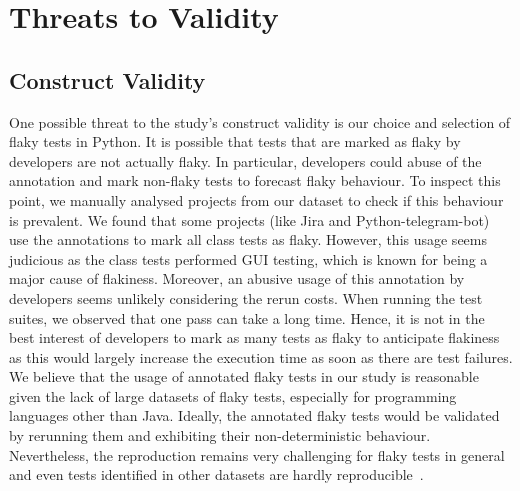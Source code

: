 \section{Threats to Validity}
\label{sec:replication-threats}

\subsection{Construct Validity}
One possible threat to the study's construct validity is our choice and selection of flaky tests in Python.
It is possible that tests that are marked as flaky by developers are not actually flaky.
In particular, developers could abuse of the annotation and mark non-flaky tests to forecast flaky behaviour.
To inspect this point, we manually analysed projects from our dataset to check if this behaviour is prevalent.
We found that some projects (like Jira and Python-telegram-bot) use the annotations to mark all class tests as flaky.
However, this usage seems judicious as the class tests performed GUI testing, which is known for being a major cause of flakiness.
Moreover, an abusive usage of this annotation by developers seems unlikely considering the rerun costs.
When running the test suites, we observed that one pass can take a long time.
Hence, it is not in the best interest of developers to mark as many tests as flaky to anticipate flakiness as this would largely increase the execution time as soon as there are test failures. 
We believe that the usage of annotated flaky tests in our study is reasonable given the lack of large datasets of flaky tests, especially for programming languages other than Java.
Ideally, the annotated flaky tests would be validated by rerunning them and exhibiting their non-deterministic behaviour.
Nevertheless, the reproduction remains very challenging for flaky tests in general and even tests identified in other datasets are hardly reproducible~\cite{Pinto2020,Lam2020}.

